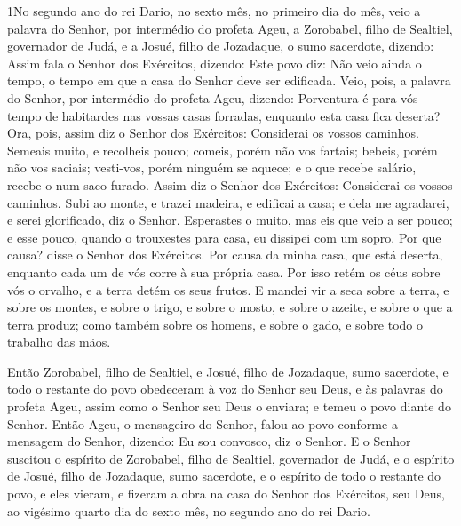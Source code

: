 \lettrine{1} No segundo ano do rei Dario, no sexto mês, no
primeiro dia do mês, veio a palavra do Senhor, por intermédio do
profeta Ageu, a Zorobabel, filho de Sealtiel, governador de Judá, e
a Josué, filho de Jozadaque, o sumo sacerdote, dizendo: Assim
fala o Senhor dos Exércitos, dizendo: Este povo diz: Não veio ainda
o tempo, o tempo em que a casa do Senhor deve ser edificada.
Veio, pois, a palavra do Senhor, por intermédio do profeta Ageu,
dizendo: Porventura é para vós tempo de habitardes nas vossas
casas forradas, enquanto esta casa fica deserta? Ora, pois,
assim diz o Senhor dos Exércitos: Considerai os vossos caminhos.
Semeais muito, e recolheis pouco; comeis, porém não vos fartais;
bebeis, porém não vos saciais; vesti-vos, porém ninguém se aquece; e
o que recebe salário, recebe-o num saco furado. Assim diz o
Senhor dos Exércitos: Considerai os vossos caminhos. Subi ao
monte, e trazei madeira, e edificai a casa; e dela me agradarei, e
serei glorificado, diz o Senhor. Esperastes o muito, mas eis que
veio a ser pouco; e esse pouco, quando o trouxestes para casa, eu
dissipei com um sopro. Por que causa? disse o Senhor dos Exércitos.
Por causa da minha casa, que está deserta, enquanto cada um de vós
corre à sua própria casa. Por isso retém os céus sobre vós o
orvalho, e a terra detém os seus frutos. E mandei vir a seca
sobre a terra, e sobre os montes, e sobre o trigo, e sobre o mosto,
e sobre o azeite, e sobre o que a terra produz; como também sobre os
homens, e sobre o gado, e sobre todo o trabalho das mãos.

Então Zorobabel, filho de Sealtiel, e Josué, filho de Jozadaque,
sumo sacerdote, e todo o restante do povo obedeceram à voz do Senhor
seu Deus, e às palavras do profeta Ageu, assim como o Senhor seu
Deus o enviara; e temeu o povo diante do Senhor. Então Ageu,
o mensageiro do Senhor, falou ao povo conforme a mensagem do Senhor,
dizendo: Eu sou convosco, diz o Senhor. E o Senhor suscitou o
espírito de Zorobabel, filho de Sealtiel, governador de Judá, e o
espírito de Josué, filho de Jozadaque, sumo sacerdote, e o espírito
de todo o restante do povo, e eles vieram, e fizeram a obra na casa
do Senhor dos Exércitos, seu Deus, ao vigésimo quarto dia do
sexto mês, no segundo ano do rei Dario.

\medskip

